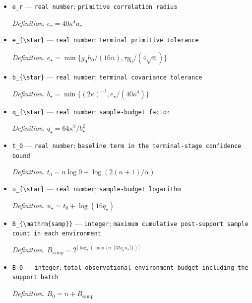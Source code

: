 \documentclass{article}
\begin{document}
\begin{itemize}
  \par\smallskip\noindent\emph{Definition.} \(a_r=4\kappa(\sqrt{t_r/N_r}+t_r/N_r)\)
  \item \texttt{e\_\allowbreak{}r} --- \texttt{real number}; \texttt{primitive correlation radius}
  \par\smallskip\noindent\emph{Definition.} \(e_r=40\kappa^4a_r\)
  \item \texttt{e\_\allowbreak{}\{\textbackslash{}\allowbreak{}star\}\allowbreak{}} --- \texttt{real number}; \texttt{terminal primitive tolerance}
  \par\smallskip\noindent\emph{Definition.} \(e_{\star}=\min\{g_0h_0/(16n),\tau g_0/(4\sqrt n)\}\)
  \item \texttt{b\_\allowbreak{}\{\textbackslash{}\allowbreak{}star\}\allowbreak{}} --- \texttt{real number}; \texttt{terminal covariance tolerance}
  \par\smallskip\noindent\emph{Definition.} \(b_{\star}=\min\{(2\kappa)^{-1},e_{\star}/(40\kappa^4)\}\)
  \item \texttt{q\_\allowbreak{}\{\textbackslash{}\allowbreak{}star\}\allowbreak{}} --- \texttt{real number}; \texttt{sample-\allowbreak{}budget factor}
  \par\smallskip\noindent\emph{Definition.} \(q_{\star}=64\kappa^2/b_{\star}^2\)
  \item \texttt{t\_\allowbreak{}0} --- \texttt{real number}; \texttt{baseline term in the terminal-\allowbreak{}stage confidence bound}
  \par\smallskip\noindent\emph{Definition.} \(t_0=n\log 9+\log(2(n+1)/\alpha)\)
  \item \texttt{u\_\allowbreak{}\{\textbackslash{}\allowbreak{}star\}\allowbreak{}} --- \texttt{real number}; \texttt{sample-\allowbreak{}budget logarithm}
  \par\smallskip\noindent\emph{Definition.} \(u_{\star}=t_0+\log(16q_{\star})\)
  \item \texttt{B\_\allowbreak{}\{\textbackslash{}\allowbreak{}mathrm\{samp\}\allowbreak{}\}\allowbreak{}} --- \texttt{integer}; \texttt{maximum cumulative post-\allowbreak{}support sample count in each environment}
  \par\smallskip\noindent\emph{Definition.} \(B_{\mathrm{samp}}=2^{\lceil\log_2(\max\{n,\lceil32q_{\star}u_{\star}\rceil\})\rceil}\)
  \item \texttt{B\_\allowbreak{}0} --- \texttt{integer}; \texttt{total observational-\allowbreak{}environment budget including the support batch}
  \par\smallskip\noindent\emph{Definition.} \(B_0=n+B_{\mathrm{samp}}\)

\end{itemize}
\end{document}
